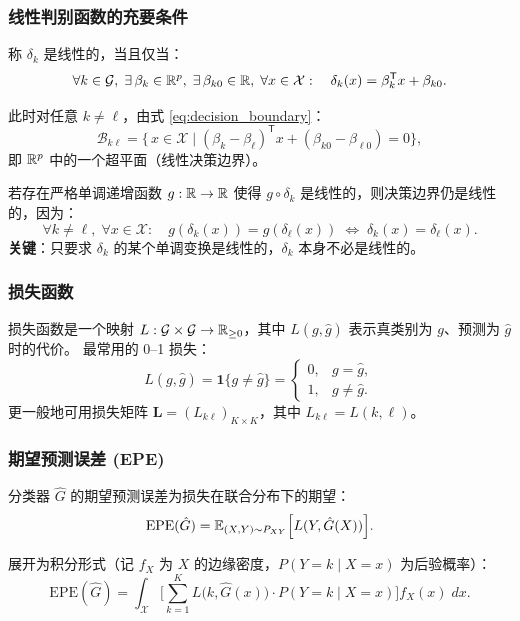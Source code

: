 \subsubsection{线性判别函数的充要条件}

称 $\delta_k$ 是线性的，当且仅当：
\[
\forall k \in \mathcal{G},\;
\exists\, \beta_k \in \mathbb{R}^p,\; \exists\, \beta_{k0} \in \mathbb{R},\;
\forall x \in \mathcal{X}: \quad \delta_k(x) = \beta_k^{\mathsf{T}} x + \beta_{k0}.
\]

此时对任意 $k \neq \ell$，由式 \eqref{eq:decision_boundary}：
\[
\mathcal{B}_{k\ell} = \Big\{\, x \in \mathcal{X} \;\Big|\;
(\beta_k - \beta_\ell)^{\mathsf{T}} x + (\beta_{k0} - \beta_{\ell 0}) = 0
\Big\},
\]
即 $\mathbb{R}^p$ 中的一个超平面（线性决策边界）。

若存在严格单调递增函数 $g : \mathbb{R} \to \mathbb{R}$ 使得 $g \circ \delta_k$ 是线性的，则决策边界仍是线性的，因为：
\[
\forall k \neq \ell,\; \forall x \in \mathcal{X}: \quad
g(\delta_k(x)) = g(\delta_\ell(x)) \;\Longleftrightarrow\; \delta_k(x) = \delta_\ell(x).
\]
\textbf{关键}：只要求 $\delta_k$ 的某个单调变换是线性的，$\delta_k$ 本身不必是线性的。

\subsubsection{损失函数}

损失函数是一个映射 $L : \mathcal{G} \times \mathcal{G} \to \mathbb{R}_{\geq 0}$，其中 $L(g, \hat{g})$ 表示真类别为 $g$、预测为 $\hat{g}$ 时的代价。
最常用的 0--1 损失：
\[
L(g, \hat{g}) = \mathbf{1}\{g \neq \hat{g}\} =
\begin{cases}
    0, & g = \hat{g}, \\
    1, & g \neq \hat{g}.
\end{cases}
\]
更一般地可用损失矩阵 $\mathbf{L} = (L_{k\ell})_{K \times K}$，其中 $L_{k\ell} = L(k, \ell)$。

\subsubsection{期望预测误差 (EPE)}

分类器 $\hat{G}$ 的期望预测误差为损失在联合分布下的期望：
\begin{equation}\label{eq:epe_classification}
    \mathrm{EPE}(\hat{G}) = \mathbb{E}_{(X,Y) \sim P_{XY}}\Big[ L(Y, \hat{G}(X)) \Big].
\end{equation}

展开为积分形式（记 $f_X$ 为 $X$ 的边缘密度，$P(Y = k \mid X = x)$ 为后验概率）：
\begin{equation}\label{eq:epe_expanded}
    \mathrm{EPE}(\hat{G}) = \int_{\mathcal{X}}
    \Bigg[ \sum_{k=1}^{K} L\big(k, \hat{G}(x)\big) \cdot P(Y = k \mid X = x) \Bigg]
    f_X(x) \; dx.
\end{equation}

